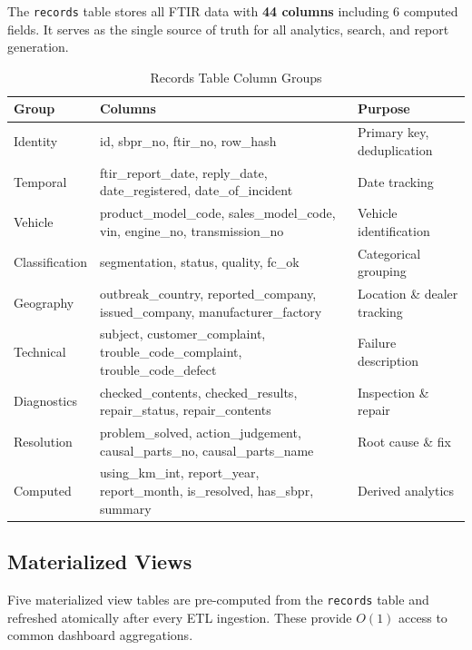 \documentclass[12pt, a4paper, twoside]{article}
\begin{document}
The \texttt{records} table stores all FTIR data with \textbf{44 columns} including 6 computed fields. It serves as the single source of truth for all analytics, search, and report generation.

\begin{table}[H]
\centering
\caption{Records Table Column Groups}
\label{tab:records-cols}
\begin{tabularx}{\textwidth}{L{2cm} L{5.5cm} X}
\toprule
{}\color{white}\textbf{Group} & \color{white}\textbf{Columns} & \color{white}\textbf{Purpose} \\
\midrule
Identity & id, sbpr\_no, ftir\_no, row\_hash & Primary key, deduplication \\
Temporal & ftir\_report\_date, reply\_date, date\_registered, date\_of\_incident & Date tracking \\
Vehicle & product\_model\_code, sales\_model\_code, vin, engine\_no, transmission\_no & Vehicle identification \\
Classification & segmentation, status, quality, fc\_ok & Categorical grouping \\
Geography & outbreak\_country, reported\_company, issued\_company, manufacturer\_factory & Location \& dealer tracking \\
Technical & subject, customer\_complaint, trouble\_code\_complaint, trouble\_code\_defect & Failure description \\
Diagnostics & checked\_contents, checked\_results, repair\_status, repair\_contents & Inspection \& repair \\
Resolution & problem\_solved, action\_judgement, causal\_parts\_no, causal\_parts\_name & Root cause \& fix \\
Computed & using\_km\_int, report\_year, report\_month, is\_resolved, has\_sbpr, summary & Derived analytics \\
\bottomrule
\end{tabularx}
\end{table}

\subsection{Materialized Views}

Five materialized view tables are pre-computed from the \texttt{records} table and refreshed atomically after every ETL ingestion. These provide $O(1)$ access to common dashboard aggregations.
\end{document}

